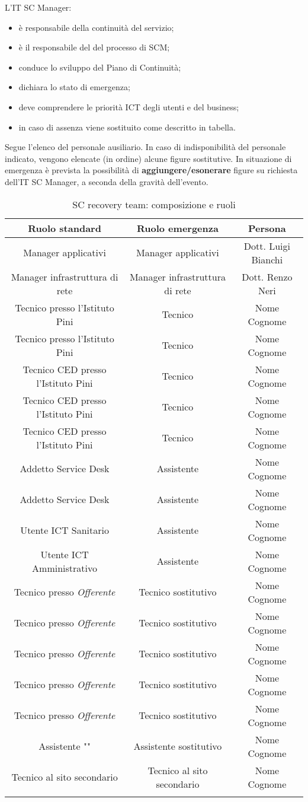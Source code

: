 L'IT SC Manager:
\begin{itemize}
\item è responsabile della continuità del servizio;
\item è il responsabile del del processo di SCM;
\item conduce lo sviluppo del Piano di Continuità;
\item dichiara lo stato di emergenza;
\item deve comprendere le priorità ICT degli utenti e del business;
\item in caso di assenza viene sostituito come descritto in tabella.
\end{itemize}

Segue l'elenco del personale ausiliario. In caso di indisponibilità del personale indicato, vengono elencate (in ordine) alcune figure sostitutive. In situazione di emergenza è prevista la possibilità di \textbf{aggiungere/esonerare} figure su richiesta dell'IT SC Manager, a seconda della gravità dell'evento. 
\renewcommand\arraystretch{1,5}
\begin{longtable}{c c c}
\toprule
\textbf{Ruolo standard} & \textbf{Ruolo emergenza} & \textbf{Persona} \\
\toprule
Manager applicativi & Manager applicativi & Dott. Luigi Bianchi \\
Manager infrastruttura di rete & Manager infrastruttura di rete & Dott. Renzo Neri \\
Tecnico presso l'Istituto Pini & Tecnico  & Nome Cognome \\
Tecnico presso l'Istituto Pini & Tecnico  & Nome Cognome \\
Tecnico CED presso l'Istituto Pini & Tecnico & Nome Cognome \\
Tecnico CED presso l'Istituto Pini & Tecnico & Nome Cognome \\
Tecnico CED presso l'Istituto Pini & Tecnico & Nome Cognome \\
Addetto Service Desk & Assistente & Nome Cognome \\
Addetto Service Desk & Assistente & Nome Cognome \\
Utente ICT Sanitario & Assistente & Nome Cognome \\
Utente ICT Amministrativo & Assistente & Nome Cognome \\
Tecnico presso \textit{Offerente} & Tecnico sostitutivo & Nome Cognome \\
Tecnico presso \textit{Offerente} & Tecnico sostitutivo & Nome Cognome \\
Tecnico presso \textit{Offerente} & Tecnico sostitutivo & Nome Cognome \\
Tecnico presso \textit{Offerente} & Tecnico sostitutivo & Nome Cognome \\
Tecnico presso \textit{Offerente} & Tecnico sostitutivo & Nome Cognome \\
Assistente "" & Assistente sostitutivo & Nome Cognome \\
Tecnico al sito secondario & Tecnico al sito secondario & Nome Cognome \\
\bottomrule
\caption{SC recovery team: composizione e ruoli}
\end{longtable}


